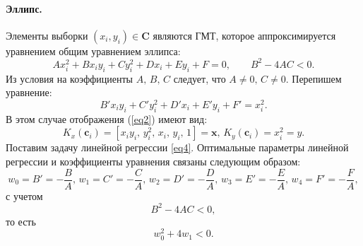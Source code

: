 \documentclass[12pt, twoside]{article}
\numberwithin{equation}{section}
\begin{document}
\paragraph{Эллипс.} Элементы выборки $(x_i, y_i) \in \mathbf{C}$ являются ГМТ, которое аппроксимируется уравнением общим уравнением эллипса: 
\begin{equation}
Ax_i^2+Bx_iy_i+Cy_i^2 + Dx_i + Ey_i + F = 0, \qquad B^2 - 4AC < 0.
\end{equation}
Из условия на коэффициенты $A, \, B, \, C$ следует, что $A \neq 0, \, C \neq 0$. 
Перепишем уравнение:
\begin{equation}
B'x_iy_i + C'y_i^2 + D'x_i + E'y_i + F' = x_i^2.
\end{equation}
В этом случае отображения (\ref{eq2}) имеют вид: 
\begin{equation}
K_{x}(\mathbf{c}_i) = [x_iy_i, \, y_i^2, \, x_i, \, y_i, \, 1] = \mathbf{x}, \,  K_{y}(\mathbf{c}_i) = x_i^2 = y.
\end{equation}
Поставим задачу линейной регрессии \eqref{eq4}.
Оптимальные параметры линейной регрессии и коэффициенты уравнения связаны следующим образом: \begin{equation}w_0 = B' = -\frac{B}{A}, \, w_1 = C' = -\frac{C}{A}, \, w_2 = D' = -\frac{D}{A}, \, w_3 = E' = -\frac{E}{A}, \, w_4 = F' = -\frac{F}{A},\end{equation} с учетом \begin{equation} \label{16}B^2 - 4AC < 0,\end{equation} то есть
\begin{equation}
\label{3.10}
w_0^2 + 4w_1 < 0.
\end{equation}
\end{document}
